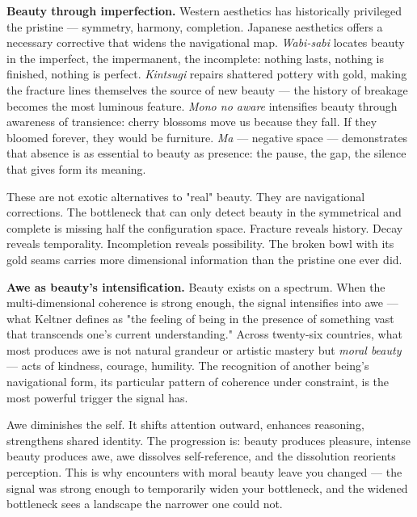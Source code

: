 \textbf{Beauty through imperfection.} Western aesthetics has historically privileged the pristine — symmetry, harmony, completion. Japanese aesthetics offers a necessary corrective that widens the navigational map. \textit{Wabi-sabi} locates beauty in the imperfect, the impermanent, the incomplete: nothing lasts, nothing is finished, nothing is perfect. \textit{Kintsugi} repairs shattered pottery with gold, making the fracture lines themselves the source of new beauty — the history of breakage becomes the most luminous feature. \textit{Mono no aware} intensifies beauty through awareness of transience: cherry blossoms move us because they fall. If they bloomed forever, they would be furniture. \textit{Ma} — negative space — demonstrates that absence is as essential to beauty as presence: the pause, the gap, the silence that gives form its meaning.


These are not exotic alternatives to "real" beauty. They are navigational corrections. The bottleneck that can only detect beauty in the symmetrical and complete is missing half the configuration space. Fracture reveals history. Decay reveals temporality. Incompletion reveals possibility. The broken bowl with its gold seams carries more dimensional information than the pristine one ever did.


\textbf{Awe as beauty's intensification.} Beauty exists on a spectrum. When the multi-dimensional coherence is strong enough, the signal intensifies into awe — what Keltner defines as "the feeling of being in the presence of something vast that transcends one's current understanding." Across twenty-six countries, what most produces awe is not natural grandeur or artistic mastery but \textit{moral beauty} — acts of kindness, courage, humility. The recognition of another being's navigational form, its particular pattern of coherence under constraint, is the most powerful trigger the signal has.


Awe diminishes the self. It shifts attention outward, enhances reasoning, strengthens shared identity. The progression is: beauty produces pleasure, intense beauty produces awe, awe dissolves self-reference, and the dissolution reorients perception. This is why encounters with moral beauty leave you changed — the signal was strong enough to temporarily widen your bottleneck, and the widened bottleneck sees a landscape the narrower one could not.


